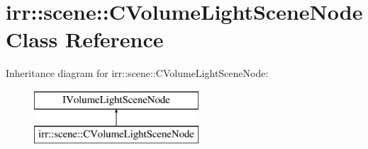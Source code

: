 \hypertarget{classirr_1_1scene_1_1_c_volume_light_scene_node}{\section{irr\-:\-:scene\-:\-:C\-Volume\-Light\-Scene\-Node Class Reference}
\label{classirr_1_1scene_1_1_c_volume_light_scene_node}
}
Inheritance diagram for irr\-:\-:scene\-:\-:C\-Volume\-Light\-Scene\-Node\-:\begin{figure}[H]
\begin{center}
\leavevmode
\includegraphics[height=2.000000cm]{classirr_1_1scene_1_1_c_volume_light_scene_node}
\end{center}
\end{figure}
